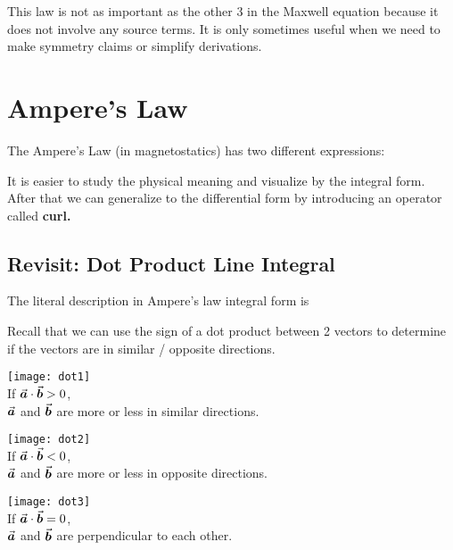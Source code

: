\documentclass[class=article, crop=false, 12pt]{standalone}
\begin{document}
This law is not as important as the other 3 in the Maxwell equation because 
it does not involve any source terms.
It is only sometimes useful when we need to make symmetry claims or simplify derivations.



\linesep
\section{Ampere's Law}

The Ampere's Law (in magnetostatics) has two different expressions:

It is easier to study the physical meaning and visualize by the integral form.
After that we can generalize to the differential form by introducing an operator called \bf{curl}.

\subsection{Revisit: Dot Product Line Integral}

The literal description in Ampere's law integral form is

Recall that we can use the sign of a dot product between 2 vectors to 
determine if the vectors are in similar / opposite directions. 

\begin{center}
    \begin{minipage}{0.27\linewidth}
        \centering
        \texttt{[image: dot1]}\\[2ex]
        If $\va*{a}\cdot\va*{b}>0$,\\
        $\va*{a}$ and $\va*{b}$ are 
        more or less in similar directions.
    \end{minipage}
    \quad\vline\quad
    \begin{minipage}{0.28\linewidth}
        \centering
        \texttt{[image: dot2]}\\
        If $\va*{a}\cdot\va*{b}<0$,\\
        $\va*{a}$ and $\va*{b}$ are 
        more or less in opposite directions.
    \end{minipage}
    \quad\vline\quad
    \begin{minipage}{0.30\linewidth}
        \centering
        \texttt{[image: dot3]}\\[1.5ex]
        If $\va*{a}\cdot\va*{b}=0$,\\
        $\va*{a}$ and $\va*{b}$ are 
        perpendicular to each other.
    \end{minipage}
\end{center}
\end{document}
